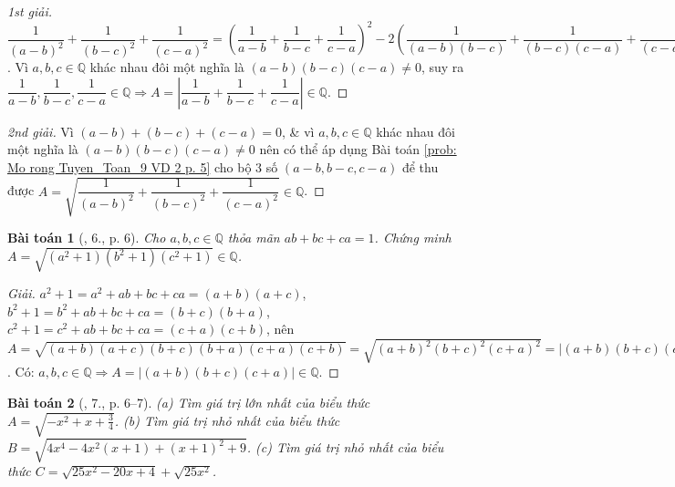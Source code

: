 \documentclass{article}
\newtheorem{baitoan}{Bài toán}
\begin{document}
\begin{proof}[1st giải]
	$\dfrac{1}{(a - b)^2} + \dfrac{1}{(b - c)^2} + \dfrac{1}{(c - a)^2} = \left(\dfrac{1}{a - b} + \dfrac{1}{b - c} + \dfrac{1}{c - a}\right)^2 - 2\left(\dfrac{1}{(a - b)(b - c)} + \dfrac{1}{(b - c)(c - a)} + \dfrac{1}{(c - a)(a - b)}\right) = \left(\dfrac{1}{a - b} + \dfrac{1}{b - c} + \dfrac{1}{c - a}\right)^2 - \dfrac{2(c - a + a - b + b - c)}{(a - b)(b - c)(c - a)} = \left(\dfrac{1}{a - b} + \dfrac{1}{b - c} + \dfrac{1}{c - a}\right)^2\Rightarrow A = \left|\dfrac{1}{a - b} + \dfrac{1}{b - c} + \dfrac{1}{c - a}\right|$. Vì $a,b,c\in\mathbb{Q}$ khác nhau đôi một nghĩa là $(a - b)(b - c)(c - a)\ne0$, suy ra $\dfrac{1}{a - b},\dfrac{1}{b - c},\dfrac{1}{c - a}\in\mathbb{Q}\Rightarrow A = \left|\dfrac{1}{a - b} + \dfrac{1}{b - c} + \dfrac{1}{c - a}\right|\in\mathbb{Q}$.
\end{proof}

\begin{proof}[2nd giải]
	Vì $(a - b) + (b - c) + (c - a) = 0$, \& vì $a,b,c\in\mathbb{Q}$ khác nhau đôi một nghĩa là $(a - b)(b - c)(c - a)\ne0$ nên có thể áp dụng Bài toán \ref{prob: Mo rong Tuyen_Toan_9 VD 2 p. 5} cho bộ 3 số $(a - b,b - c,c - a)$ để thu được $A = \sqrt{\dfrac{1}{(a - b)^2} + \dfrac{1}{(b - c)^2} + \dfrac{1}{(c - a)^2}}\in\mathbb{Q}$.
\end{proof}

\begin{baitoan}[\cite{Tuyen_Toan_9}, 6., p. 6]
	Cho $a,b,c\in\mathbb{Q}$ thỏa mãn $ab + bc + ca = 1$. Chứng minh $A = \sqrt{(a^2 + 1)(b^2 + 1)(c^2 + 1)}\in\mathbb{Q}$.
\end{baitoan}

\begin{proof}[Giải]
	$a^2 + 1 = a^2 + ab + bc + ca = (a + b)(a + c)$, $b^2 + 1 = b^2 + ab + bc + ca = (b + c)(b + a)$, $c^2 + 1 = c^2 + ab + bc + ca = (c + a)(c + b)$, nên $A = \sqrt{(a + b)(a + c)(b + c)(b + a)(c + a)(c + b)} = \sqrt{(a + b)^2(b + c)^2(c + a)^2} = |(a + b)(b + c)(c + a)|$. Có: $a,b,c\in\mathbb{Q}\Rightarrow A = |(a + b)(b + c)(c + a)|\in\mathbb{Q}$.
\end{proof}

\begin{baitoan}[\cite{Tuyen_Toan_9}, 7., p. 6--7]
	(a) Tìm giá trị lớn nhất của biểu thức $A = \sqrt{-x^2 + x + \frac{3}{4}}$. (b) Tìm giá trị nhỏ nhất của biểu thức $B = \sqrt{4x^4 - 4x^2(x + 1) + (x + 1)^2 + 9}$. (c) Tìm giá trị nhỏ nhất của biểu thức $C = \sqrt{25x^2 - 20x + 4} + \sqrt{25x^2}$.
\end{baitoan}
\end{document}
